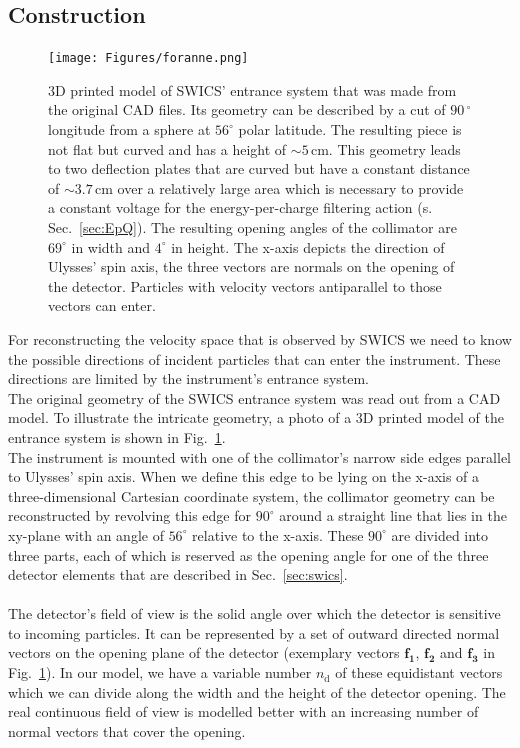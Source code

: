 \subsection{Construction} 
\label{subsec:construction}
\begin{figure}[h]
	\texttt{[image: Figures/foranne.png]}
	\centering
	\caption{3D printed model of SWICS' entrance system that was made from the original CAD files. Its geometry can be described by a cut of $90\,^\circ$ longitude from a sphere at $56 ^\circ$ polar latitude. The resulting piece is not flat but curved and has a height of $\sim 5\,\mathrm{cm}$. This geometry leads to two deflection plates that are curved but have a constant distance of $\sim 3.7\,\mathrm{cm}$ over a relatively large area which is necessary to provide a constant voltage for the energy-per-charge filtering action (s. Sec.~\ref{sec:EpQ}). The resulting opening angles of the collimator are $69^\circ$ in width and $4^\circ$ in height. The x-axis depicts the direction of Ulysses' spin axis, the three vectors are normals on the opening of the detector. Particles with velocity vectors antiparallel to those vectors can enter.}
	\label{fig:3dcol}
\end{figure}
For reconstructing the velocity space that is observed by SWICS we need to know the possible directions of incident particles that can enter the instrument. These directions are limited by the instrument's entrance system.
\\
The original geometry of the SWICS entrance system was read out from a CAD model. To illustrate the intricate geometry, a photo of a 3D printed model of the entrance system is shown in Fig.~\ref{fig:3dcol}.\\
The instrument is mounted with one of the collimator's narrow side edges parallel to Ulysses' spin axis. When we define this edge to be lying on the x-axis of a three-dimensional Cartesian coordinate system, the collimator geometry can be reconstructed by revolving this edge for $90^\circ$ around a straight line that lies in the xy-plane with an angle of $56^\circ$ relative to the x-axis.  These $90^\circ$ are divided into three parts, each of which is reserved as the opening angle for one of the three detector elements that are described in Sec.~\ref{sec:swics}. \\ \\
The detector's field of view is the solid angle over which the detector is sensitive to incoming particles.
It can be represented by a set of outward directed normal vectors on the opening plane of the detector (exemplary vectors $\mathrm{\mathbf{f_1}}$, $\mathrm{\mathbf{f_2}}$ and $\mathrm{\mathbf{f_3}}$ in Fig.~\ref{fig:3dcol}). In our model, we have a variable number $n_\mathrm{d}$ of these equidistant vectors which we can divide along the width and the height of the detector opening. The real continuous field of view is modelled better with an increasing number of normal vectors that cover the opening. \\

